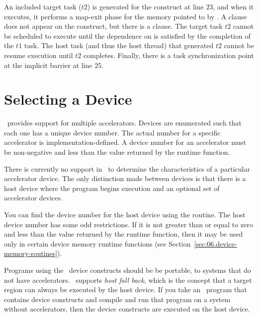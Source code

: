 An included target task ($t2$) is generated for the 
construct at line $23$, and when it executes, it performs a map-exit phase for
the memory pointed to by .  
A  clause does not appear on the construct, but there is a
 clause.  The target task $t2$ cannot be scheduled to execute until the dependence
on  is satisfied by the completion of the $t1$ task.  
The host task (and thus the host thread)
that generated $t2$ cannot be resume execution until $t2$ completes.
Finally, there is a task
synchronization point at the implicit barrier at line $25$.

\section{Selecting a Device}
\label{sec:06.which-device}

\OMP\ provides support for multiple accelerators.  Devices are
enumerated such that each one has a unique device number.  The actual number
for a specific accelerator is implementation-defined.  A device number
for an accelerator must be non-negative and less than the value
returned by the  runtime function.

There is currently no support in \OMP\ to determine the characteristics of a
particular accelerator device.  The only distinction made between devices is
that there is a host device where the program begins execution and an optional
set of accelerator devices.

You can find the device number for the host device using the
 routine.  The host device number has some odd
restrictions.  If it is not greater than or equal to zero and less than the
value returned by the  runtime function, then it may
be used only in certain device memory runtime functions (see
Section~\ref{sec:06.device-memory-routines}).

Programs using the \OMP\ device constructs should be be portable,
to systems that do not have accelerators.  \OMP\ supports \emph{host
fall back}, which is the concept that a target region can always be executed by
the host device.  If you take an \OMP\ program that contains device constructs
and compile and run that program on a system without accelerators, then the
device constructs are executed on the host device.

